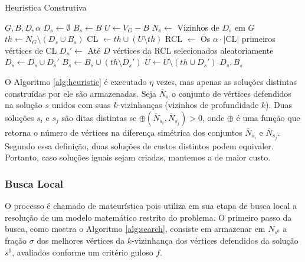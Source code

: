 \documentclass{MO824}
\begin{document}
    \begin{algorithm}[H]
    \caption{Heurística Construtiva}
    \label{alg:heuristic}
    \begin{algorithmic}[1]
        \REQUIRE $G, B, D, \alpha$
        \STATE $D_s \leftarrow \emptyset$ 
        \STATE $B_s \leftarrow B$ 
        \STATE $U \leftarrow V_G - B$ 
        \REPEAT
            \STATE $N_s \leftarrow$ Vizinhos de $D_s$ em $G$
            \STATE $th \leftarrow N_G \setminus (D_s \cup B_s)$ 
            \STATE CL $\leftarrow th \cup (U \setminus th)$ 
            \STATE RCL $\leftarrow$ Os $\alpha \cdot |\text{CL}|$ primeiros vértices de CL
            \STATE $D_s' \leftarrow$ Até $D$ vértices da RCL selecionados aleatoriamente
            \STATE $D_s \leftarrow D_s \cup D_s'$
            \STATE $B_s \leftarrow B_s \cup (th \setminus D_s')$ 
            \STATE $U \leftarrow U \setminus (th \cup D_s')$
        \RETURN $D_s, B_s$
    \end{algorithmic}
    \end{algorithm}
    
    O Algoritmo \ref{alg:heuristic} é executado $\eta$ vezes, mas apenas as soluções distintas construídas por ele são armazenadas. Seja $\overline{N}_s$ o conjunto de vértices defendidos na solução $s$ unidos com suas $k$-vizinhanças (vizinhos de profundidade $k$). Duas soluções $s_i$ e $s_j$ são ditas distintas se $\oplus(\overline{N}_{s_i},\overline{N}_{s_j}) > 0$, onde $\oplus$ é uma função que retorna o número de vértices na diferença simétrica dos conjuntos $\overline{N}_{s_i}$ e $\overline{N}_{s_j}$. Segundo essa definição, duas soluções de custos distintos podem equivaler. Portanto, caso soluções iguais sejam criadas, mantemos a de maior custo. 

    \subsubsection{Busca Local} \label{search}

    O processo é chamado de mateurística pois utiliza em sua etapa de busca local a resolução de um modelo matemático restrito do problema. O primeiro passo da busca, como mostra o Algoritmo \ref{alg:search}, consiste em armazenar em $N_{s^0}$ a fração $\sigma$ dos melhores vértices da $k$-vizinhança dos vértices defendidos da solução $s^0$, avaliados conforme um critério guloso $f$. 
    
\end{document}
